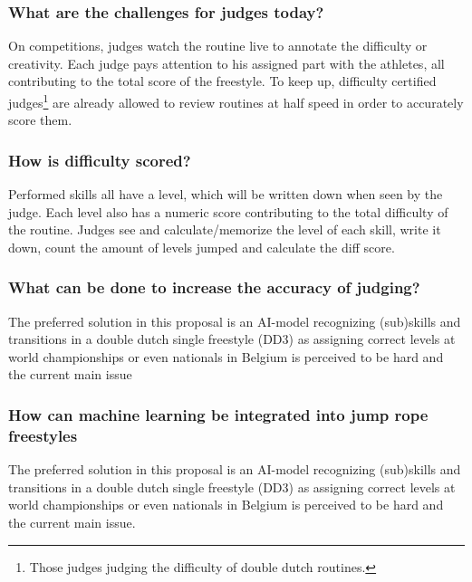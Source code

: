 \subsubsection{What are the challenges for judges today?}
\label{subsubsec:intro-question-challenges-for-judges}

On competitions, judges watch the routine live to annotate the difficulty or creativity. Each judge pays attention to his assigned part with the athletes, all contributing to the total score of the freestyle. To keep up, difficulty certified judges\footnote{Those judges judging the difficulty of double dutch routines.} are already allowed to review routines at half speed in order to accurately score them.

\subsubsection{How is difficulty scored?}
\label{subsubsec:intro-question-difficulty-scored}

Performed skills all have a level, which will be written down when seen by the judge. Each level also has a numeric score contributing to the total difficulty of the routine. Judges see and calculate/memorize the level of each skill, write it down, count the amount of levels jumped and calculate the diff score.

\subsubsection{What can be done to increase the accuracy of judging?}
\label{subsubsec:intro-question-how-to-increase-accuracy}

The preferred solution in this proposal is an AI-model recognizing (sub)skills and transitions in a double dutch single freestyle (DD3) as assigning correct levels at world championships or even nationals in Belgium is perceived to be hard and the current main issue

\subsubsection{How can machine learning be integrated into jump rope freestyles}
\label{subsubsec:intro-question-integration}

The preferred solution in this proposal is an AI-model recognizing (sub)skills and transitions in a double dutch single freestyle (DD3) as assigning correct levels at world championships or even nationals in Belgium is perceived to be hard and the current main issue.

